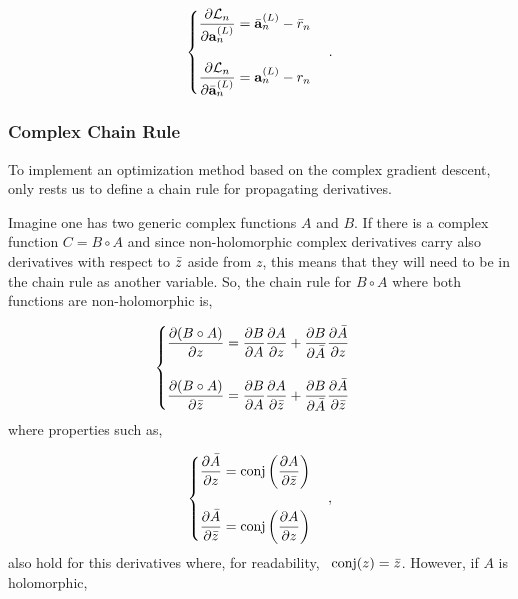 \begin{equation}
	\begin{cases}
		\dfrac{\partial \mathcal{L}_n}{\partial \mathbf{a}^{(L)}_{n}} = \bar{\mathbf{a}}^{(L)}_{n} - \bar{r}_n \\
		\\
		\dfrac{\partial \mathcal{L}_n}{\partial \bar{\mathbf{a}}^{(L)}_{n}} = \mathbf{a}^{(L)}_{n} - r_n
	\end{cases}.
\end{equation}

\subsubsection{Complex Chain Rule}
To implement an optimization method based on the complex gradient descent, only rests us to define a chain rule for propagating derivatives. 

Imagine one has two generic complex functions $ A $ and $ B $. If there is a complex function $ C = B \circ A $ and since non-holomorphic complex derivatives carry also derivatives with respect to $ \bar{z} $ aside from $ z $, this means that they will need to be in the chain rule as another variable. So, the chain rule for $ B \circ A $ where both functions are non-holomorphic is,

\begin{equation}
	\begin{cases}
		\dfrac{\partial (B \circ A)}{\partial z} = \dfrac{\partial B}{\partial A}\dfrac{\partial A}{\partial z} + \dfrac{\partial B}{\partial \bar{A}}\dfrac{\partial \bar{A}}{\partial z} \\
		\\
		\dfrac{\partial (B \circ A)}{\partial \bar{z}} = \dfrac{\partial B}{\partial A}\dfrac{\partial A}{\partial \bar{z}} + \dfrac{\partial B}{\partial \bar{A}}\dfrac{\partial \bar{A}}{\partial \bar{z}} \\
	\end{cases}
	\label{eq:AB_nonholo}
\end{equation}
where properties such as,

\begin{equation}
	\begin{cases}
		\dfrac{\partial \bar{A}}{\partial z} = \text{conj}\left( \dfrac{\partial A}{\partial \bar{z}} \right) \\
		\\
		\dfrac{\partial \bar{A}}{\partial \bar{z}} = \text{conj}\left( \dfrac{\partial A}{\partial z} \right)
	\end{cases},
	\label{eq:comp_conj_div}
\end{equation}
also hold for this derivatives where, for readability,~ $ \text{conj}(z) = \bar{z} $. However, if $ A $ is holomorphic,

